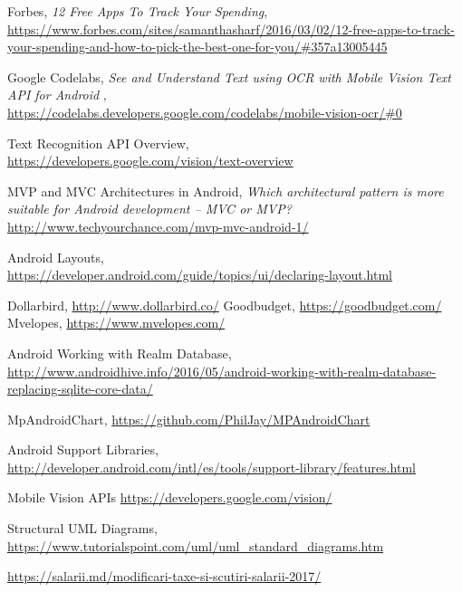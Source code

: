 \begin{thebibliography}{99999}
\singlespace\normalsize

 Forbes, \textit{12 Free Apps To Track Your Spending}, \\ \url{https://www.forbes.com/sites/samanthasharf/2016/03/02/12-free-apps-to-track-your-spending-and-how-to-pick-the-best-one-for-you/#357a13005445} %

 Google Codelabs, \textit{See and Understand Text using OCR with Mobile Vision Text API for Android} , \\ \url{https://codelabs.developers.google.com/codelabs/mobile-vision-ocr/#0} %

 Text Recognition API Overview, \\
\url{https://developers.google.com/vision/text-overview} %

 MVP and MVC Architectures in Android, \textit{Which architectural pattern is more suitable for Android development – MVC or MVP?} \\
\url{http://www.techyourchance.com/mvp-mvc-android-1/} %

Android Layouts, \\ \url{https://developer.android.com/guide/topics/ui/declaring-layout.html} %

 Dollarbird, \url{http://www.dollarbird.co/} %
 Goodbudget, \url{https://goodbudget.com/} %
 Mvelopes, \url{https://www.mvelopes.com/}

 Android Working with Realm Database, \\ \url{http://www.androidhive.info/2016/05/android-working-with-realm-database-replacing-sqlite-core-data/}

 MpAndroidChart, \url{https://github.com/PhilJay/MPAndroidChart}

 Android Support Libraries, \\
\url{http://developer.android.com/intl/es/tools/support-library/features.html}

 Mobile Vision APIs \url{https://developers.google.com/vision/}

 Structural UML Diagrams, \url{https://www.tutorialspoint.com/uml/uml_standard_diagrams.htm}

 \url{https://salarii.md/modificari-taxe-si-scutiri-salarii-2017/}

\end{thebibliography}

